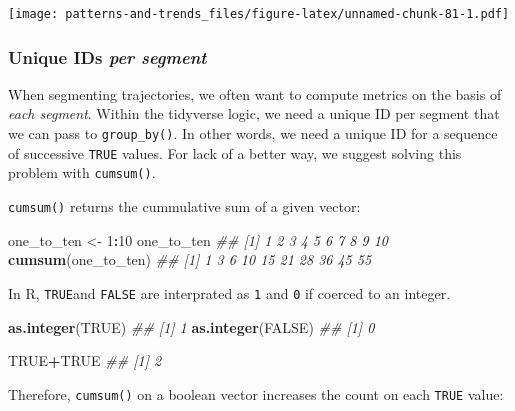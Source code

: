 \documentclass[]{book}
\newenvironment{Shaded}{\begin{snugshade}}{\end{snugshade}}
\newcommand{\CommentTok}[1]{\textcolor[rgb]{0.56,0.35,0.01}{\textit{#1}}}
\newcommand{\DecValTok}[1]{\textcolor[rgb]{0.00,0.00,0.81}{#1}}
\newcommand{\KeywordTok}[1]{\textcolor[rgb]{0.13,0.29,0.53}{\textbf{#1}}}
\newcommand{\NormalTok}[1]{#1}
\newcommand{\OperatorTok}[1]{\textcolor[rgb]{0.81,0.36,0.00}{\textbf{#1}}}
\newcommand{\OtherTok}[1]{\textcolor[rgb]{0.56,0.35,0.01}{#1}}
\newcommand{\StringTok}[1]{\textcolor[rgb]{0.31,0.60,0.02}{#1}}
\begin{document}
\texttt{[image: patterns-and-trends\_files/figure-latex/unnamed-chunk-81-1.pdf]}

\hypertarget{unique-ids-per-segment}{%
\subsubsection{\texorpdfstring{Unique IDs \emph{per segment}}{Unique IDs per segment}}\label{unique-ids-per-segment}}

When segmenting trajectories, we often want to compute metrics on the basis of \emph{each segment}. Within the tidyverse logic, we need a unique ID per segment that we can pass to \texttt{group\_by()}. In other words, we need a unique ID for a sequence of successive \texttt{TRUE} values. For lack of a better way, we suggest solving this problem with \texttt{cumsum()}.

\texttt{cumsum()} returns the cummulative sum of a given vector:

\begin{Shaded}
\begin{Highlighting}[]
\NormalTok{one_to_ten <-}\StringTok{ }\DecValTok{1}\OperatorTok{:}\DecValTok{10}
\NormalTok{one_to_ten}
\CommentTok{##  [1]  1  2  3  4  5  6  7  8  9 10}
\KeywordTok{cumsum}\NormalTok{(one_to_ten)}
\CommentTok{##  [1]  1  3  6 10 15 21 28 36 45 55}
\end{Highlighting}
\end{Shaded}

In R, \texttt{TRUE}and \texttt{FALSE} are interprated as \texttt{1} and \texttt{0} if coerced to an integer.

\begin{Shaded}
\begin{Highlighting}[]
\KeywordTok{as.integer}\NormalTok{(}\OtherTok{TRUE}\NormalTok{)}
\CommentTok{## [1] 1}
\KeywordTok{as.integer}\NormalTok{(}\OtherTok{FALSE}\NormalTok{)}
\CommentTok{## [1] 0}

\OtherTok{TRUE}\OperatorTok{+}\OtherTok{TRUE}
\CommentTok{## [1] 2}
\end{Highlighting}
\end{Shaded}

Therefore, \texttt{cumsum()} on a boolean vector increases the count on each \texttt{TRUE} value:
\end{document}
